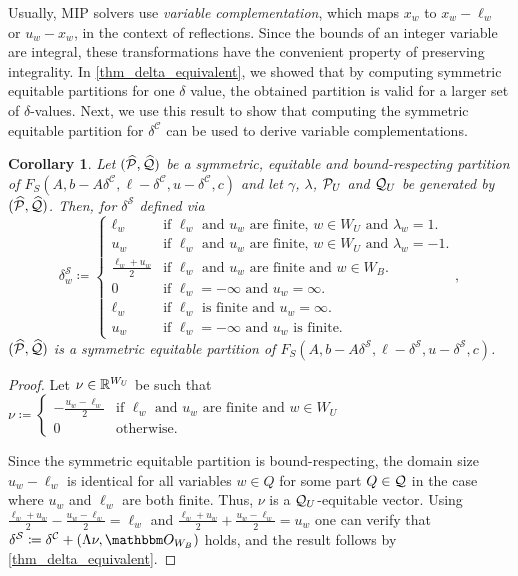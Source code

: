 \documentclass[pdflatex,sn-mathphys-num]{sn-jnl}%
\theoremstyle{thmstyleone}%
\theoremstyle{thmstylethree}%
\newtheorem{corollary}[corollary]{Corollary}
\theoremstyle{thmstyletwo}%
\begin{document}
Usually, MIP solvers use \emph{variable complementation}, which maps $x_w$ to $x_w - \ell_w$ or $u_w - x_w$, in the context of reflections. Since the bounds of an integer variable are integral, these transformations have the convenient property of preserving integrality.
In \cref{thm_delta_equivalent}, we showed that by computing symmetric equitable partitions for one $\delta$ value, the obtained partition is valid for a larger set of $\delta$-values. Next, we use this result to show that computing the symmetric equitable partition for $\delta^\mathcal{C}$ can be used to derive variable complementations.
\begin{corollary}
    \label{thm_delta_equivalent_complemented}
    Let $(\widehat{\mathcal{P}},\widehat{\mathcal{Q}})$ be a symmetric, equitable and bound-respecting partition of $F_S(A,b - A \delta^\mathcal{C}, \ell - \delta^\mathcal{C}, u - \delta^\mathcal{C}, c)$ and let $\gamma$, $\lambda$, $\mathcal{P}_U$ and $\mathcal{Q}_U$ be generated by $(\widehat{\mathcal{P}},\widehat{\mathcal{Q}})$. Then, for $\delta^\mathcal{S}$ defined via  
    \begin{equation*}
    \delta^\mathcal{S}_w \coloneqq \begin{cases}
        \ell_w &\text{if $\ell_w$ and $u_w$ are finite, $w\in W_U$ and $\lambda_w=1$.}\\
        u_w &\text{if $\ell_w$ and $u_w$ are finite, $w\in W_U$ and $\lambda_w=-1$.}\\
        \frac{\ell_w + u_w}2 &\text{if $\ell_w$ and $u_w$ are finite and $w\in W_B$.}\\
        0 &\text{if $\ell_w = -\infty$ and $u_w = \infty$.}\\
        \ell_w &\text{if $\ell_w$ is finite and $u_w = \infty$.}\\
        u_w &\text{if $\ell_w = -\infty$ and $u_w$ is finite.}
    \end{cases},
\end{equation*} $(\widehat{\mathcal{P}},\widehat{\mathcal{Q}})$ is a symmetric equitable partition of $F_S(A,b - A \delta^\mathcal{S}, \ell - \delta^\mathcal{S}, u - \delta^\mathcal{S}, c)$.
\end{corollary}
\begin{proof}
    Let $\nu \in \mathbb{R}^{W_U}$ be such that $\nu \coloneqq \begin{cases}
        -\frac{u_{w}- \ell_w}2 &\text{if $\ell_w$ and $u_w$ are finite and $w\in W_U$}\\
        0 &\text{otherwise.}
    \end{cases}$
    
    Since the symmetric equitable partition is bound-respecting, the domain size $u_w - \ell_w$ is identical for all variables $w\in Q$ for some part $Q \in \mathcal{Q}$ in the case where $u_w$ and $\ell_w$ are both finite. Thus, $\nu$ is a $\mathcal{Q}_U$-equitable vector.
    Using $\frac{\ell_w + u_w}2 -\frac{u_{w}- \ell_w}2 = \ell_w$ and $\frac{\ell_w + u_w}2 + \frac{u_{w}- \ell_w}2 = u_w$ one can verify that $\delta^\mathcal{S} \coloneqq \delta^\mathcal{C} + (\Lambda \nu, \zerovec_{W_B})$ holds, and the result follows by \cref{thm_delta_equivalent}.
\end{proof}
\end{document}
